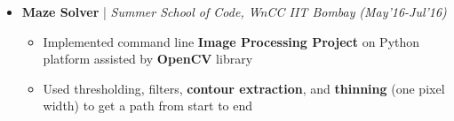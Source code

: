 \documentclass[a4paper, 10pt]{article}
\newcommand{\isep}{-2 pt}
\begin{document}
\begin{itemize}
\vspace{-0.18cm}

\item \textbf{\large Maze Solver} | \textit{ Summer School of Code, WnCC IIT Bombay} \hfill \emph{(May'16-Jul'16)} \\
    \vspace{2pt}
	\begin{itemize}\itemsep \isep
	
	\vspace{-0.70cm}
		\item Implemented command line \textbf{Image Processing Project} on Python platform assisted by \textbf{OpenCV} library
\item Used thresholding, filters, \textbf{contour extraction}, and \textbf{thinning} (one pixel width) to get a path from start to end
	\end{itemize}


\end{itemize}
\end{document}
